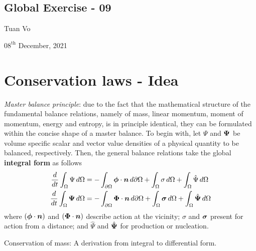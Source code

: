 \documentclass[12pt]{article}
\begin{document}
\begin{center}
	\section*{Global Exercise - 09}
\end{center}
\begin{center}
	Tuan Vo
\end{center}
\begin{center}
	$08^{\text{th}}$ December, 2021
\end{center}
\section{Conservation laws - Idea}
\emph{Master balance principle}: due to the fact that the mathematical structure of the fundamental balance relations,
namely of mass, linear momentum, moment of momentum, energy and entropy, is in principle identical, they can be 
formulated within the concise shape of a master balance. To begin with, let $\Psi$ and ${\boldsymbol{\Psi}}$ be volume specific
scalar and vector value densities of a physical quantity to be balanced, respectively. Then, the general balance relations take 
the global \textbf{integral form} as follows 
\begin{align}
	\frac{d}{dt}\int_{\Omega} \Psi \,d\Omega  & = 
	-\int_{\partial\Omega}{\boldsymbol{\phi}}\cdot{\boldsymbol{\mathnormal n}}\,d\partial\Omega 
	+ \int_{\Omega}\sigma\,d\Omega
	+ \int_{\Omega}\hat{\Psi}\,d\Omega             \\
	\frac{d}{dt}\int_{\Omega} {\boldsymbol{\Psi}} \,d\Omega & = 
	-\int_{\partial\Omega}{\boldsymbol{\Phi}}\cdot{\boldsymbol{\mathnormal n}}\,d\partial\Omega 
	+ \int_{\Omega}{\boldsymbol{\sigma}}\,d\Omega
	+ \int_{\Omega}\hat{{\boldsymbol{\Psi}}}\,d\Omega
\end{align}
where $({\boldsymbol{\phi}}\cdot{\boldsymbol{\mathnormal n}})$ and $({\boldsymbol{\Phi}}\cdot{\boldsymbol{\mathnormal n}})$ describe action at the vicinity; $\sigma$ and 
${\boldsymbol{\sigma}}$ present for action from a distance; and $\hat{\Psi}$ and $\hat{{\boldsymbol{\Psi}}}$ for production or nucleation.
\begin{example}
	Conservation of mass: A derivation from integral to differential form.
\end{example}
\end{document}
